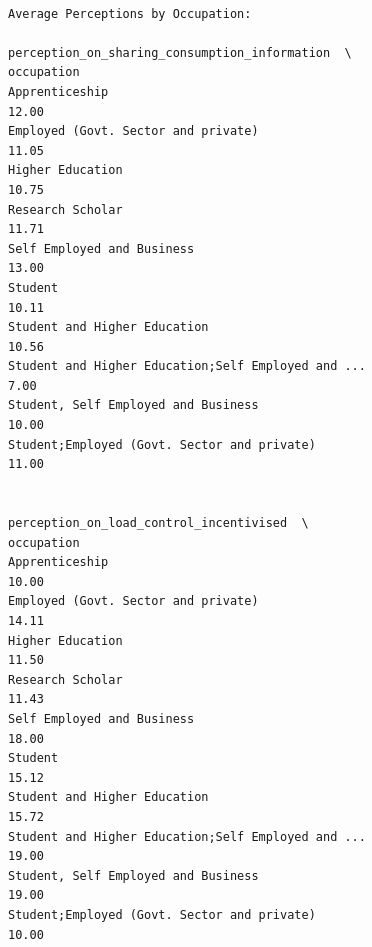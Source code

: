 \documentclass[
  letterpaper,
  DIV=11,
  numbers=noendperiod]{scrartcl}
\begin{document}
\begin{verbatim}

Average Perceptions by Occupation:
                                                     perception_on_sharing_consumption_information  \
occupation                                                                                          
Apprenticeship                                                                              12.00   
Employed (Govt. Sector and private)                                                         11.05   
Higher Education                                                                            10.75   
Research Scholar                                                                            11.71   
Self Employed and Business                                                                  13.00   
Student                                                                                     10.11   
Student and Higher Education                                                                10.56   
Student and Higher Education;Self Employed and ...                                           7.00   
Student, Self Employed and Business                                                         10.00   
Student;Employed (Govt. Sector and private)                                                 11.00   

                                                    perception_on_load_control_incentivised  \
occupation                                                                                    
Apprenticeship                                                                        10.00   
Employed (Govt. Sector and private)                                                   14.11   
Higher Education                                                                      11.50   
Research Scholar                                                                      11.43   
Self Employed and Business                                                            18.00   
Student                                                                               15.12   
Student and Higher Education                                                          15.72   
Student and Higher Education;Self Employed and ...                                    19.00   
Student, Self Employed and Business                                                   19.00   
Student;Employed (Govt. Sector and private)                                           10.00   


\end{verbatim}
\end{document}
